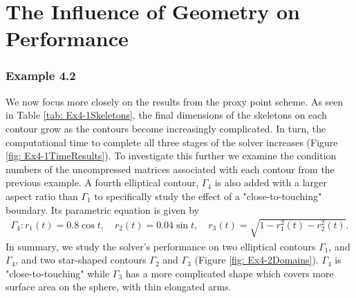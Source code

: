 \documentclass{sfuthesis}
\begin{document}
\section{The Influence of Geometry on Performance}
\subsubsection{Example 4.2}
We now focus more closely on the results from the proxy point scheme. As seen in Table \ref{tab: Ex4-1Skeletons}, the final  dimensions of the skeletons on each contour grow as the contours become increasingly complicated. In turn, the computational time to complete all three stages of the solver increases (Figure \ref{fig: Ex4-1TimeResults}). To investigate this further we examine the condition numbers of the uncompressed matrices associated with each contour from the previous example. A fourth elliptical contour, $\Gamma_4$ is also added with a larger aspect ratio than $\Gamma_1$ to specifically study the effect of a "close-to-touching" boundary. Its parametric equation is given by 
\begin{align*}
	\Gamma_4 : r_1(t)=0.8 \cos t, \quad r_2(t)=0.04 \sin t, \quad r_3(t)= \sqrt{1-r_1^2(t)-r_2^2(t)}.
\end{align*}
In summary, we study the solver's performance on two elliptical contours $\Gamma_1$, and $\Gamma_4$, and two star-shaped contours $\Gamma_2$ and $\Gamma_3$ (Figure \ref{fig: Ex4-2Domains}). $\Gamma_4$ is "close-to-touching" while $\Gamma_3$ has a more complicated shape which covers more surface area on the sphere, with thin elongated arms. 
\end{document}
